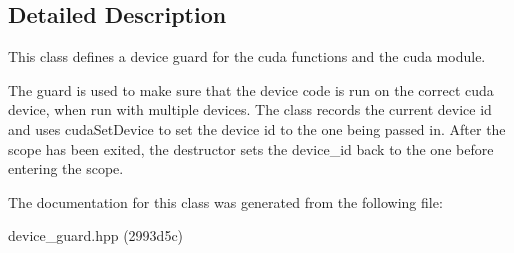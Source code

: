 \subsection{Detailed Description}
This class defines a device guard for the cuda functions and the cuda module. 

The guard is used to make sure that the device code is run on the correct cuda device, when run with multiple devices. The class records the current device id and uses {\ttfamily cuda\+Set\+Device} to set the device id to the one being passed in. After the scope has been exited, the destructor sets the device\+\_\+id back to the one before entering the scope. 

The documentation for this class was generated from the following file\+:\begin{DoxyCompactItemize}
\item 
device\+\_\+guard.\+hpp (2993d5c)\end{DoxyCompactItemize}
